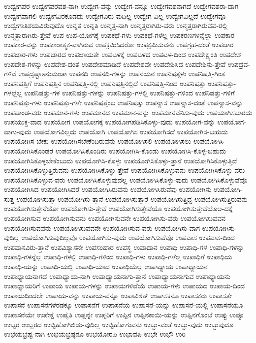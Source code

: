 {ಉದ್ವೇಗಪರ
ಉದ್ವೇಗಪರವಶ-ನಾಗಿ
ಉದ್ವೇಗ-ವನ್ನು
ಉದ್ವೇಗ-ವನ್ನೂ
ಉದ್ವೇಗವಶನಾಗದೆ
ಉದ್ವೇಗವಶರಾ-ದಾಗ
ಉದ್ವೇಗವಾಗಲಿ
ಉದ್ವೇಗವಿರಕೂಡದು
ಉದ್ವೇಗವಿರು-ವುದಿಲ್ಲ
ಉದ್ವೇಗ-ವಿಲ್ಲ
ಉದ್ವೇಗವಿಲ್ಲದೆ
ಉದ್ವೇಗವೂ
ಉದ್ವೇಗಾತಿಶಯವಿರುವುದೊ
ಉನ್ನತ
ಉನ್ನತಿ
ಉನ್ಮತ್ತ-ನಾಗಿ
ಉನ್ಮತ್ತರಾಗಿರು-ವರು
ಉನ್ಮತ್ತರಾಗಿರುವವ-ರಲ್ಲಿ
ಉನ್ಮತ್ತಾರಾಗಿರು-ತ್ತೇವೆ
ಉಪ
ಉಪ-ಯೋಗಕ್ಕೆ
ಉಪಕಥೆ-ಗಳು
ಉಪಕಥೆ-ಗಳೆಲ್ಲ
ಉಪಕರಣಗಳನ್ನೆಲ್ಲಾ
ಉಪಕಾರ
ಉಪಕಾರ-ವನ್ನು
ಉಪಕಾರಾತ್ಮಕ-ವಾಗಿರುವ
ಉಪಕ್ರಮಿಸಿದರೋ
ಉಪಕ್ರಮಿಸುವನು
ಉಪಗ್ರಹ-ದಂತೆ
ಉಪಚಾರ
ಉಪಚಾರ-ಗಳು
ಉಪಚಾರದ
ಉಪಜಾಯತೇ
ಉಪಟಳಕ್ಕೆ
ಉಪಟಳದ
ಉಪಟಳ-ದಿಂದ
ಉಪದೇಕ್ಷ್ಯಂತಿ
ಉಪದೇಶ
ಉಪದೇಶ-ಗಳನ್ನು
ಉಪದೇಶ-ದಂತೆ
ಉಪದೇಶಮಾಡಿದೆ
ಉಪದೇಶವೇ
ಉಪದೇಶಿಸಿದ
ಉಪದೇಶಿಸು-ತ್ತೇವೆ
ಉಪದ್ರವ-ಗಳಿವೆ
ಉಪದ್ರಷ್ಟಾಽನುಮಂತಾ
ಉಪನದಿ
ಉಪನದಿ-ಗಳನ್ನು
ಉಪನಯನ
ಉಪನಿಷತ್ಗಳು
ಉಪನಿಷತ್ತಿ-ಗಿಂತ
ಉಪನಿಷತ್ತಿಗೆ
ಉಪನಿಷತ್ತಿನ
ಉಪನಿಷತ್ತಿ-ನಲ್ಲಿ
ಉಪನಿಷತ್ತಿನಲ್ಲಿದೆ
ಉಪನಿಷತ್ತಿ-ನಿಂದ
ಉಪನಿಷತ್ತು
ಉಪನಿಷತ್ತು-ಗಳಲ್ಲೆಲ್ಲ
ಉಪನಿಷತ್ತು-ಗಳ
ಉಪನಿಷತ್ತು-ಗಳನ್ನು
ಉಪನಿಷತ್ತು-ಗಳಲ್ಲಿ
ಉಪನಿಷತ್ತು-ಗಳಿಂದ
ಉಪನಿಷತ್ತು-ಗಳಿಗೆ
ಉಪನಿಷತ್ತು-ಗಳು
ಉಪನಿಷತ್ತು-ಗಳೇ
ಉಪನಿಷತ್ತೆಂಬ
ಉಪನಿಷತ್ಸು
ಉಪನ್ಯಾಸ
ಉಪನ್ಯಾಸ-ದಂತೆ
ಉಪನ್ಯಾಸ-ವನ್ನು
ಉಪಪಾಂಡ-ವರು
ಉಪಮಾನ-ಗಳು
ಉಪಮಾನದ
ಉಪಮಾನ-ವನ್ನು
ಉಪಮಾನವೆನಿಸು-ವುದು
ಉಪಯಾಗಿಸಬಾರದು
ಉಪಯುಕ್ತ-ವಾದ
ಉಪಯೋಗ
ಉಪಯೋಗಕ್ಕೆ
ಉಪಯೋಗಪಡಿಸಿಕೊಳ್ಳು-ವುದು
ಉಪಯೋಗ-ವನ್ನು
ಉಪಯೋಗ-ವಾಗು-ವುದು
ಉಪಯೋಗವಿಲ್ಲದು
ಉಪಯೋಗಿ
ಉಪಯೋಗಿಸ
ಉಪಯೋಗಿಸದೆ
ಉಪಯೋಗಿಸ-ಬಹುದು
ಉಪಯೋಗಿಸ-ಬೇಕು
ಉಪಯೋಗಿಸಬೇಕೆಂದಿರುವನು
ಉಪಯೋಗಿಸಲಿ
ಉಪಯೋಗಿಸಲು
ಉಪಯೋಗಿಸಿ
ಉಪಯೋಗಿಸಿಕೊಂಡರೆ
ಉಪಯೋಗಿಸಿಕೊಂಡಿರು
ಉಪಯೋಗಿಸಿ-ಕೊಂಡು
ಉಪಯೋಗಿಸಿ-ಕೊಳ್ಳ-ಬಹುದು
ಉಪಯೋಗಿಸಿಕೊಳ್ಳಬೇಕೆಂಬುದು
ಉಪಯೋಗಿಸಿ-ಕೊಳ್ಳು
ಉಪಯೋಗಿಸಿಕೊಳ್ಳು-ತ್ತಾನೆ
ಉಪಯೋಗಿಸಿಕೊಳ್ಳುತ್ತಿದೆ
ಉಪಯೋಗಿಸಿಕೊಳ್ಳುತ್ತಿರುವನು
ಉಪಯೋಗಿಸಿಕೊಳ್ಳು-ತ್ತೇವೆ
ಉಪಯೋಗಿಸಿಕೊಳ್ಳುವನು
ಉಪಯೋಗಿಸಿಕೊಳ್ಳು-ವರು
ಉಪಯೋಗಿಸಿಕೊಳ್ಳುವ-ವರು
ಉಪಯೋಗಿಸಿಕೊಳ್ಳುವುದಲ್ಲ
ಉಪಯೋಗಿಸಿಕೊಳ್ಳು-ವುದು
ಉಪಯೋಗಿಸಿಕೊಳ್ಳುವೆವೊ
ಉಪಯೋಗಿಸಿದ
ಉಪಯೋಗಿಸಿದರೆ
ಉಪಯೋಗಿಸಿರುವನು
ಉಪಯೋಗಿಸಿರುವೆವು
ಉಪಯೋಗಿಸು
ಉಪಯೋಗಿ-ಸುತ್ತ
ಉಪಯೋಗಿಸುತ್ತಾ
ಉಪಯೋಗಿಸು-ತ್ತಾನೆ
ಉಪಯೋಗಿಸುತ್ತಾರೆ
ಉಪಯೋಗಿಸುತ್ತಿದ್ದ
ಉಪಯೋಗಿಸುತ್ತಿರುವನು
ಉಪಯೋಗಿಸುತ್ತೇನೆಯೋ
ಉಪಯೋಗಿಸು-ತ್ತೇವೆ
ಉಪಯೋಗಿಸುತ್ತೇವೆಯೊ
ಉಪಯೋಗಿಸುತ್ತೇವೆಯೊಅ-ದಕ್ಕೆ
ಉಪಯೋಗಿಸುವ
ಉಪಯೋಗಿಸುವನು
ಉಪಯೋಗಿಸುವನೇ
ಉಪಯೋಗಿಸು-ವರು
ಉಪಯೋಗಿಸುವವನ
ಉಪಯೋಗಿಸುವವನು
ಉಪಯೋಗಿಸುವವನೇ
ಉಪಯೋಗಿಸುವ-ವರು
ಉಪಯೋಗಿಸು-ವಾಗ
ಉಪಯೋಗಿಸು-ವುದಿಲ್ಲ
ಉಪಯೋಗಿಸುವುದಿಲ್ಲವೊ
ಉಪಯೋಗಿಸು-ವುದು
ಉಪಯೋಗಿಸುವೆವೊ
ಉಪವಾಸ
ಉಪವಾಸ-ದಿಂದ
ಉಪವಾಸವಿರು-ತ್ತಾನೆ
ಉಪವಿಶ್ಯಾಸನೇ
ಉಪಸಂಹಾರ
ಉಪಸ್ಥ
ಉಪಾದಾನ
ಉಪಾಧಿ
ಉಪಾಧಿ-ಗಳ
ಉಪಾಧಿ-ಗಳನ್ನು
ಉಪಾಧಿ-ಗಳನ್ನೆಲ್ಲ
ಉಪಾಧಿ-ಗಳಲ್ಲಿ
ಉಪಾಧಿ-ಗಳಿಂದ
ಉಪಾಧಿ-ಗಳು
ಉಪಾಧಿ-ಗಳೆಲ್ಲ
ಉಪಾಧಿಗೆ
ಉಪಾಧಿಯ
ಉಪಾಧಿ-ಯನ್ನು
ಉಪಾಧಿ-ಯಲ್ಲಿ
ಉಪಾಧಿ-ಯಾದ
ಉಪಾಧಿಯೆಲ್ಲ
ಉಪಾಧ್ಯಾಯ
ಉಪಾಧ್ಯಾಯನ
ಉಪಾಧ್ಯಾಯನಾಗದೆ
ಉಪಾಧ್ಯಾಯ-ನಾಗಿ
ಉಪಾಧ್ಯಾಯನಾಗು-ತ್ತಾನೆ
ಉಪಾಧ್ಯಾಯನಾಗುವ
ಉಪಾಧ್ಯಾಯನು
ಉಪಾಧ್ಯಾಯರಿಗೆ
ಉಪಾಯ
ಉಪಾಯ-ಗಳನ್ನು
ಉಪಾಯಗಳಿವೆಯೆ
ಉಪಾಯ-ಗಳು
ಉಪಾಯದ
ಉಪಾಯ-ದಿಂದ
ಉಪಾಯದಿಂದಲೇ
ಉಪಾಯ-ವನ್ನು
ಉಪಾಯ-ವನ್ನೂ
ಉಪಾವಿಶತ್
ಉಪಾಸಕನೂ
ಉಪಾಸಕರು
ಉಪಾಸತೇ
ಉಪಾಸನೆ
ಉಪಾಸನೆಗಳೆರಡಕ್ಕೂ
ಉಪಾಸನೆಗೆ
ಉಪಾಸನೆಯ
ಉಪಾಸನೆ-ಯನ್ನು
ಉಪಾಸನೆ-ಯಲ್ಲಿ
ಉಪಾಸನೆಯೂ
ಉಪಾಸನೆಯೇ
ಉಪೇಕ್ಷೆ
ಉಪೈತಿ
ಉಪ್ಪನ್ನೇ
ಉಪ್ಪರಿಗೆ
ಉಪ್ಪಿನ
ಉಪ್ಪಿನಕಾಯಿ-ಯನ್ನು
ಉಪ್ಪಿನಗೊಂಬೆ
ಉಪ್ಪು
ಉಪ್ಪೂ
ಉಬ್ಬರ
ಉಬ್ಬರದ
ಉಬ್ಬಿಹೋಗಿಬಿಡು-ವುದಿಲ್ಲ
ಉಬ್ಬಿಹೋಗುವನು
ಉಬ್ಬು-ವಂತೆ
ಉಬ್ಬು-ವುದು
ಉಬ್ಬುವುದೂ
ಉಭಯಭ್ರಷ್ಟ-ನಾಗಿ
ಉಭಯಭ್ರಷ್ಠನೂ
ಉಭಯೋರಪಿ
ಉಭಾವಪಿ
ಉಭೇ
ಉಭೌ
ಉರಿ
}
